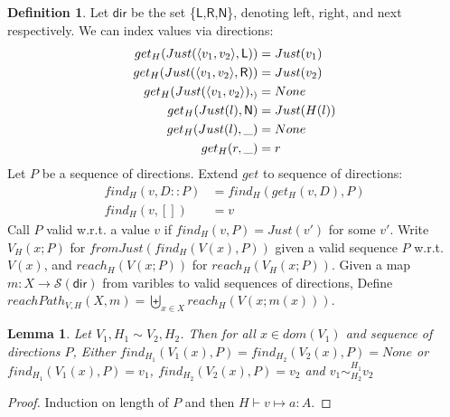 \documentclass{easychair}
\newcommand{\ms}[1]{\ensuremath{\mathsf{#1}}}
\newcommand{\veq}[4]{#3 \sim^{#1}_{#2} #4}
\newtheorem{lemma}[theorem]{Lemma}
\theoremstyle{definition}
\newtheorem{definition}{Definition}
\begin{document}
\begin{definition}
	Let \ms{dir} be the set \{\ms{L},\ms{R},\ms{N}\}, denoting left, right, and next 
	respectively. We can index values via directions:
	\begin{align*}
		get_H(Just(\pairexcst{v_1}{v_2},\ms{L})) &= Just(v_1)\\
		get_H(Just(\pairexcst{v_1}{v_2},\ms{R})) &= Just(v_2)\\
		get_H(Just(\pairexcst{v_1}{v_2}),_) &= None\\
		get_H(Just(l),\ms{N}) &= Just(H(l)) \\
		get_H(Just(l), \_) &= None\\
		get_H(r,\_) &= r
	\end{align*}
	Let $P$ be a sequence of directions. Extend $get$ to sequence of directions:
	\begin{align*}
		find_H(v,D::P) &= find_H(get_H(v,D),P)\\
		find_H(v,[]) &= v
	\end{align*}
	Call $P$ valid w.r.t. a value $v$ if $find_H(v,P) = Just (v')$ for some $v'$.
	Write $V_H(x;P)$ for $fromJust(find_H(V(x),P))$ given a valid sequence $P$ w.r.t. $V(x)$,
	and $reach_H(V(x;P))$ for $reach_H(V_H(x;P))$.
	Given a map $m : X \to \mathcal{S}(\ms{dir})$ from varibles to valid sequences of directions, 
	Define $reachPath_{V,H}(X,m) = \biguplus_{x \in X} reach_H(V(x;m(x)))$.
	
\end{definition}

\begin{lemma}
	Let $V_1,H_1 \sim V_2,H_2$. Then for all $x \in dom(V_1)$ and sequence of directions $P$, 
	Either $find_{H_1}(V_1(x),P) = find_{H_2}(V_2(x),P) = None$ or 
	$find_{H_1}(V_1(x),P) = v_1$, $find_{H_2}(V_2(x),P) = v_2$ and
	$\veq{H_1}{H_2}{v_1}{v_2}$
\end{lemma}

\begin{proof}
	Induction on length of $P$ and then $H \vdash v \mapsto a : A$.
\end{proof}
\end{document}

